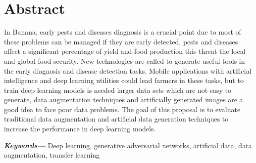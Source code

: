\chapter*{Abstract}


In Banana, early pests and diseases diagnosis is a crucial point due to most of these problems can be managed if they are early detected, pests and diseases affect a significant percentage of yield and food production this threat the local and global food security. New technologies are called to generate useful tools in the early diagnosis and disease detection tasks. Mobile applications with artificial intelligence and deep learning utilities could lead farmers in these tasks, but to train deep learning models is needed larger data sets which are not easy to generate, data augmentation techniques and artificially generated images are a good idea to face poor data problems. The goal of this proposal is to evaluate traditional data augmentation and artificial data generation techniques to increase the performance in deep learning models.

\providecommand{\keywords}[1]
{
  \small	
  \textbf{\textit{Keywords---}} #1
}

\keywords{Deep learning, generative adversarial networks, artificial data, data augmentation, transfer learning}